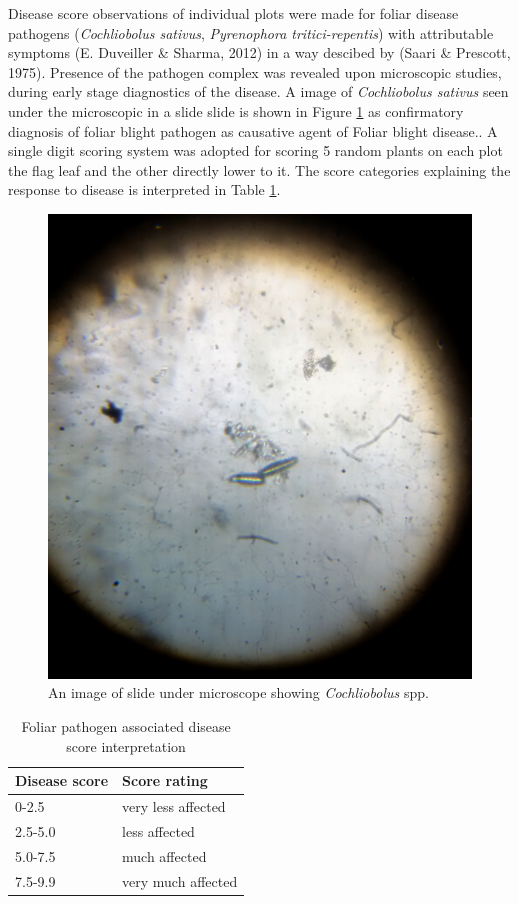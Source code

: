 \documentclass[12pt,oneside]{dukestatscithesis} %
\theoremstyle{definition}
\theoremstyle{definition}
\theoremstyle{definition}
\theoremstyle{remark}
\begin{document}
Disease score observations of individual plots were made for foliar
disease pathogens (\emph{Cochliobolus sativus}, \emph{Pyrenophora
tritici-repentis}) with attributable symptoms (E. Duveiller \& Sharma,
2012) in a way descibed by (Saari \& Prescott, 1975). Presence of the
pathogen complex was revealed upon microscopic studies, during early
stage diagnostics of the disease. A image of \emph{Cochliobolus sativus}
seen under the microscopic in a slide slide is shown in Figure
\ref{fig:microscope-disease} as confirmatory diagnosis of foliar blight
pathogen as causative agent of Foliar blight disease.. A single digit
scoring system was adopted for scoring 5 random plants on each plot the
flag leaf and the other directly lower to it. The score categories
explaining the response to disease is interpreted in Table
\ref{tab:fpa-leaf-score}.
\begin{figure}

{\centering \includegraphics[width=0.8\linewidth]{./images/disease_diag/distinct_spores_20161225_114304} 

}

\caption{An image of slide under microscope showing \textit{Cochliobolus} spp.}\label{fig:microscope-disease}
\end{figure}
\begin{table}

\caption{\label{tab:fpa-leaf-score}Foliar pathogen associated disease score interpretation}
\centering
\begin{tabular}[t]{ll}
\toprule
\textbf{Disease score} & \textbf{Score rating}\\
\midrule
0-2.5 & very less affected\\
2.5-5.0 & less affected\\
5.0-7.5 & much affected\\
7.5-9.9 & very much affected\\
\bottomrule
\end{tabular}
\end{table}
\end{document}

